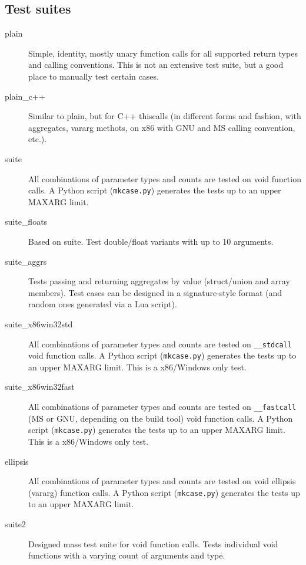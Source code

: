 \subsection{Test suites}

\begin{description}

\item [plain] 
Simple, identity, mostly unary function calls for all supported return types
and calling conventions. This is not an extensive test suite, but a good place
to manually test certain cases.

\item [plain\_c++] 
Similar to plain, but for C++ thiscalls (in different forms and fashion, with
aggregates, vararg methots, on x86 with GNU and MS calling convention, etc.).

\item [suite] 
All combinations of parameter types and counts are tested on void function
calls. A Python script ({\tt mkcase.py}) generates the tests up to
an upper MAXARG limit.

\item [suite\_floats]
Based on suite. Test double/float variants with up to 10 arguments.

\item [suite\_aggrs]
Tests passing and returning aggregates by value (struct/union and array members).
Test cases can be designed in a signature-style format (and random ones generated
via a Lua script).

\item [suite\_x86win32std] 
All combinations of parameter types and counts are tested on {\tt \_\_stdcall}
void function calls. A Python script ({\tt mkcase.py}) generates
the tests up to an upper MAXARG limit. This is a x86/Windows only test.

\item [suite\_x86win32fast] 
All combinations of parameter types and counts are tested on {\tt \_\_fastcall}
(MS or GNU, depending on the build tool) void function calls.
A Python script ({\tt mkcase.py}) generates the tests up to
an upper MAXARG limit. This is a x86/Windows only test.

\item [ellipsis]
All combinations of parameter types and counts are tested on void ellipsis 
(vararg) function calls. A Python script ({\tt mkcase.py}) generates the 
tests up to an upper MAXARG limit.

\item [suite2]
Designed mass test suite for void function calls.
Tests individual void functions with a varying count of arguments and type.


\end{description}
